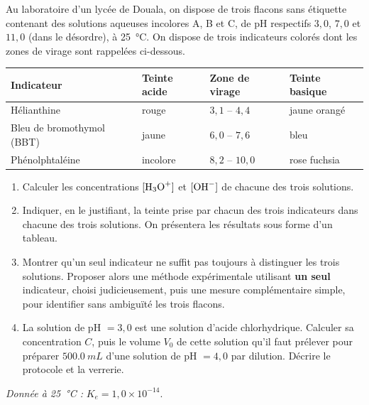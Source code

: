 \documentclass[11pt]{article}
\newcounter{popsec}
\newcounter{popsub}
\newcommand{\courssub}[1]{%
  \stepcounter{popsub}%
  \par\vspace{9pt}\noindent{\popxbold\fontsize{11.5}{13}\selectfont\color{popink}{\color{poporange}\thepopsec.\thepopsub}\hspace{6pt}#1}\par\nopagebreak\vspace{4pt}
}
\begin{document}
\courssub{Je me prépare au Bac}

\begin{exercice}
Au laboratoire d'un lycée de Douala, on dispose de trois flacons sans étiquette contenant des solutions aqueuses incolores A, B et C, de pH respectifs $3{,}0$, $7{,}0$ et $11{,}0$ (dans le désordre), à \SI{25}{\celsius}. On dispose de trois indicateurs colorés dont les zones de virage sont rappelées ci-dessous.

\begin{center}
\begin{tabularx}{\linewidth}{|l|X|X|X|}
\hline
\rowcolor{popblueL} \textbf{Indicateur} & \textbf{Teinte acide} & \textbf{Zone de virage} & \textbf{Teinte basique} \\
\hline
Hélianthine & rouge & $3{,}1$ -- $4{,}4$ & jaune orangé \\
\hline
Bleu de bromothymol (BBT) & jaune & $6{,}0$ -- $7{,}6$ & bleu \\
\hline
Phénolphtaléine & incolore & $8{,}2$ -- $10{,}0$ & rose fuchsia \\
\hline
\end{tabularx}
\end{center}

\begin{enumerate}
\item Calculer les concentrations $[\ce{H3O+}]$ et $[\ce{OH-}]$ de chacune des trois solutions.
\item Indiquer, en le justifiant, la teinte prise par chacun des trois indicateurs dans chacune des trois solutions. On présentera les résultats sous forme d'un tableau.
\item Montrer qu'un seul indicateur ne suffit pas toujours à distinguer les trois solutions. Proposer alors une méthode expérimentale utilisant \textbf{un seul} indicateur, choisi judicieusement, puis une mesure complémentaire simple, pour identifier sans ambiguïté les trois flacons.
\item La solution de pH $= 3{,}0$ est une solution d'acide chlorhydrique. Calculer sa concentration $C$, puis le volume $V_0$ de cette solution qu'il faut prélever pour préparer $\SI{500,0}{mL}$ d'une solution de pH $= 4{,}0$ par dilution. Décrire le protocole et la verrerie.
\end{enumerate}
\emph{Donnée à \SI{25}{\celsius} :} $K_e = 1{,}0 \times 10^{-14}$.
\end{exercice}
\end{document}
